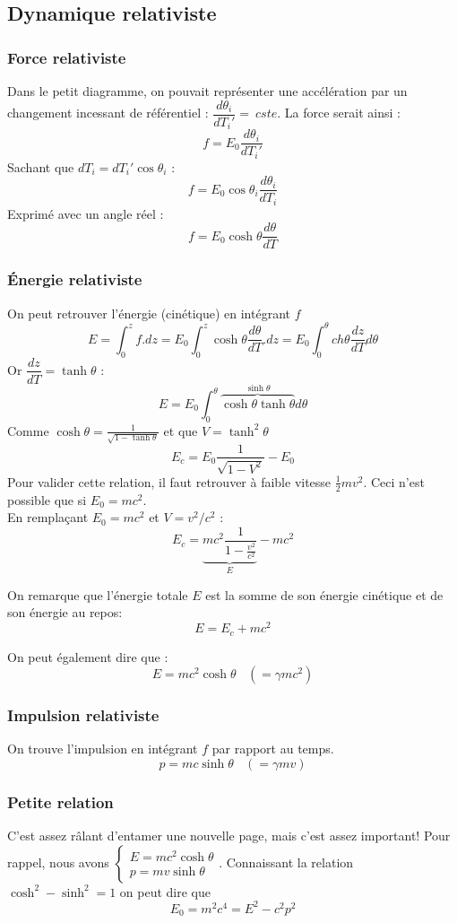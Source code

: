 \documentclass	[11pt, a4paper, openany]{book}
\begin{document}
	\subsection*{Dynamique relativiste}
	\subsubsection*{Force relativiste}
	Dans le petit diagramme, on pouvait représenter une accélération par un changement incessant de référentiel : $\dfrac{d\theta_i}{dT_i'} =\ cste$. La force serait ainsi :
	$$f = E_0\dfrac{d\theta_i}{dT_i'}$$
	Sachant que $dT_i = dT_i'\cos\theta_i$ :
	$$f = E_0\cos\theta_i \frac{d\theta_i}{dT_i}$$
	Exprimé avec un angle réel :
	$$ f = E_0 \cosh\theta \frac{d\theta}{dT}$$
	
	\subsubsection{Énergie relativiste}
	On peut retrouver l'énergie (cinétique) en intégrant $f$
	$$E = \int_0^z f.dz = E_0\int_0^z \cosh\theta\frac{d\theta}{dT}.dz = E_0\int_0^\theta ch\theta\frac{dz}{dT}d\theta$$
	Or $\dfrac{dz}{dT} = \tanh\theta$ :
	$$E = E_0 \int_0^\theta \overbrace{\cosh\theta\tanh\theta}^{\sinh\theta}d\theta$$
	Comme $\cosh\theta = \frac{1}{\sqrt{1 - \tanh\theta}}$ et que $V = \tanh^2\theta$
	$$E_c = E_0\frac{1}{\sqrt{1-V^2}} - E_0$$
	Pour valider cette relation, il faut retrouver à faible vitesse $\frac{1}{2}mv^2$. Ceci n'est possible que si $E_0 = mc^2$.\\
	En remplaçant $E_0 = mc^2$ et $V = v^2/c^2$ :
	$$E_c = \underbrace{mc^2 \dfrac{1}{1 - \frac{v^2}{c^2}}}_E - mc^2$$
	
	On remarque que l'énergie totale $E$ est la somme de son énergie cinétique et de son énergie au repos:
	$$E = E_c + mc^2$$
	
	On peut également dire que :
	$$E = mc^2\cosh\theta\ \ \ \ (= \gamma mc^2)$$
	
	\subsubsection*{Impulsion relativiste}
	On trouve l'impulsion en intégrant $f$ par rapport au temps.
	$$p = mc\sinh\theta\ \ \ \ (= \gamma mv)$$
	
	\subsubsection*{Petite relation}
	C'est assez râlant d'entamer une nouvelle page, mais c'est assez important! Pour rappel, nous avons $\left\{\begin{array}{l}
	E = mc^2\cosh\theta\\
	p = mv\sinh\theta
	\end{array}\right.$. Connaissant la relation $\cosh^2 - \sinh^2 = 1$ on peut dire que 
	$$E_0 = m^2c^4 = E^2 - c^2p^2$$
	
\end{document}
